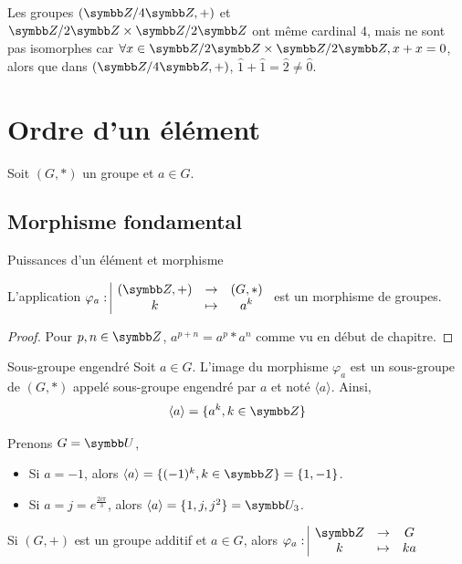 \begin{exemple}
    Les groupes $(\Z/4\Z, +)$ et $\Z / 2\Z \times \Z / 2\Z$ ont même cardinal 4,
    mais ne sont pas isomorphes car $\forall x \in \Z / 2\Z \times \Z / 2\Z, x + x = 0$,
    alors que dans $(\Z/4\Z, +)$, $\hat 1 + \hat 1 = \hat 2 \neq \hat 0$.
\end{exemple}

\section{Ordre d'un élément}

Soit $(G, \ast)$ un groupe et $a \in G$.

\subsection{Morphisme fondamental}

\begin{theoreme}{Puissances d'un élément et morphisme}{}

    L'application $\fonction{\varphi_a}{(\Z, +)}{(G, \ast)}{k}{a^k}$ est un morphisme de groupes.
\end{theoreme}

\begin{proof}
    Pour $p, n \in \Z$, $a^{p + n} = a^p \ast a^n$ comme vu en début de chapitre. 
\end{proof}

\begin{definition}{Sous-groupe engendré}{}
    Soit $a \in G$. 
    L'image du morphisme $\varphi_a$ est un sous-groupe de $(G, \ast)$ appelé
    sous-groupe engendré par $a$ et noté $\langle a \rangle$. 
    Ainsi, 
    \[\langle a \rangle = \{a^k, k \in \Z\}\]
\end{definition}

\begin{exemple}
    Prenons $G = \symbb U$,
    \begin{itemize}
        \item Si $a = -1$, alors $\langle a \rangle = \{(-1)^k, k \in \Z\} = \{1, -1\}$.
        \item Si $\displaystyle a = j = e^{\frac{2i\pi}3}$, alors $\langle a \rangle = \{1, j, j^2\} = \symbb U_3$.
    \end{itemize}
\end{exemple}

\begin{remarque}
    Si $(G, +)$ est un groupe additif et $a \in G$, alors 
    $\fonction {\varphi_a} \Z G k {ka}$ 
\end{remarque}


